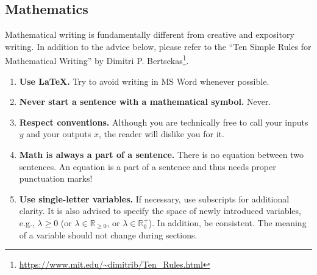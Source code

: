 \documentclass[twoside,11pt]{article}
\begin{document}
\subsection*{Mathematics}
Mathematical writing is fundamentally different from creative and expository writing. In addition to the advice below, please refer to the ``Ten Simple Rules for Mathematical Writing'' by Dimitri P. Bertsekas\footnote{\url{https://www.mit.edu/~dimitrib/Ten_Rules.html}}.
\begin{enumerate}
    \item \textbf{Use \LaTeX.} Try to avoid writing in MS Word whenever possible.
    
    \item \textbf{Never start a sentence with a mathematical symbol.} Never.
    
    \item \textbf{Respect conventions.} Although you are technically free to call your inputs $y$ and your outputs $x$, the reader will dislike you for it.
    
    \item \textbf{Math is always a part of a sentence.} There is no equation between two sentences. An equation is a part of a sentence and thus needs proper punctuation marks!
    
    \item \textbf{Use single-letter variables.} If necessary, use subscripts for additional clarity. It is also advised to specify the space of newly introduced variables, e.g., $\lambda\geq0$ (or $\lambda\in\mathbb{R}_{\geq0}$, or $\lambda\in\mathbb{R}_0^+$). In addition, be consistent. The meaning of a variable should not change during sections.    
\end{enumerate}
\end{document}

